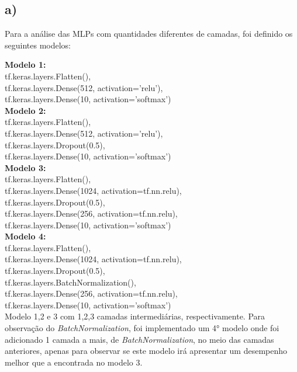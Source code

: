 \documentclass[12pt]{article}
\begin{document}
\subsection*{a)}

Para a análise das MLPs com quantidades diferentes de camadas, foi definido os seguintes modelos:

\textbf{Modelo 1:}\\
tf.keras.layers.Flatten(),\\ \color{red}
tf.keras.layers.Dense(512, activation='relu'),\\ \color{black}
tf.keras.layers.Dense(10, activation='softmax')\\

\textbf{Modelo 2:}\\
tf.keras.layers.Flatten(),\\ \color{red}
tf.keras.layers.Dense(512, activation='relu'),\\
tf.keras.layers.Dropout(0.5),\\ \color{black}
tf.keras.layers.Dense(10, activation='softmax')\\

\textbf{Modelo 3:}\\
tf.keras.layers.Flatten(),\\ \color{red}
tf.keras.layers.Dense(1024, activation=tf.nn.relu),\\
tf.keras.layers.Dropout(0.5),\\
tf.keras.layers.Dense(256, activation=tf.nn.relu),\\ \color{black}
tf.keras.layers.Dense(10, activation='softmax')\\


\textbf{Modelo 4:}\\
tf.keras.layers.Flatten(),\\ \color{red}
tf.keras.layers.Dense(1024, activation=tf.nn.relu),\\
tf.keras.layers.Dropout(0.5),\\
tf.keras.layers.BatchNormalization(),\\
tf.keras.layers.Dense(256, activation=tf.nn.relu),\\ \color{black}
tf.keras.layers.Dense(10, activation='softmax')\\

Modelo 1,2 e 3 com 1,2,3 camadas intermediárias, respectivamente. Para observação do \textit{BatchNormalization}, foi implementado um 4° modelo onde foi adicionado 1 camada a mais, de \textit{BatchNormalization}, no meio das camadas anteriores, apenas para observar se este modelo irá apresentar um desempenho melhor que a encontrada no modelo 3.
\end{document}

